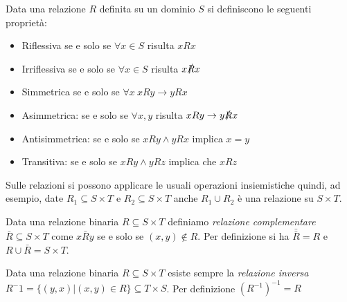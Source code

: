 Data una relazione $R$ definita su un dominio $S$ si definiscono le seguenti proprietà:
\begin{itemize}
  \item Riflessiva se e solo se $\forall x \in S$ risulta  $xRx$
  \item Irriflessiva se e solo se $\forall x \in S$ risulta $x \slashed{R} x$
  \item Simmetrica se e solo se $\forall x \ xRy \rightarrow yRx$
  \item Asimmetrica: se e solo se $\forall x,y$ risulta $xRy \rightarrow y \slashed{R} x$
  \item Antisimmetrica: se e solo se $xRy \land yRx$ implica $x = y$
  \item Transitiva: se e solo se $xRy \land yRz$ implica che $xRz$
\end{itemize}




Sulle relazioni si possono applicare le usuali operazioni insiemistiche quindi, ad esempio,
date $R_1 \subseteq S \times T$ e $R_2 \subseteq S \times T$ anche $R_1 \cup R_2$ è una relazione su $S \times T$.

Data una relazione binaria $R \subseteq S \times T$ definiamo \emph{relazione complementare}
$\bar{R} \subseteq S \times T$ come $x \bar{R} y$ se e solo se $(x,y) \not \in R$.
Per definizione si ha $\bar{\bar{R}} = R$ e $R \cup \bar{R} = S \times T$.

Data una relazione binaria $R \subseteq S \times T$ esiste sempre la \emph{relazione inversa}
$R^-1 = \{(y,x) | (x,y) \in R\} \subseteq T \times S$.
Per definizione $(R ^ {-1}) ^ {-1} = R$

